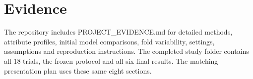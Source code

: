 \documentclass[10pt,a4paper]{article}
\begin{document}
\section*{Evidence}
The repository includes PROJECT\_EVIDENCE.md for detailed methods, attribute profiles, initial model comparisons, fold variability, settings, assumptions and reproduction instructions. The completed study folder contains all 18 trials, the frozen protocol and all six final results. The matching presentation plan uses these same eight sections.
\end{document}
